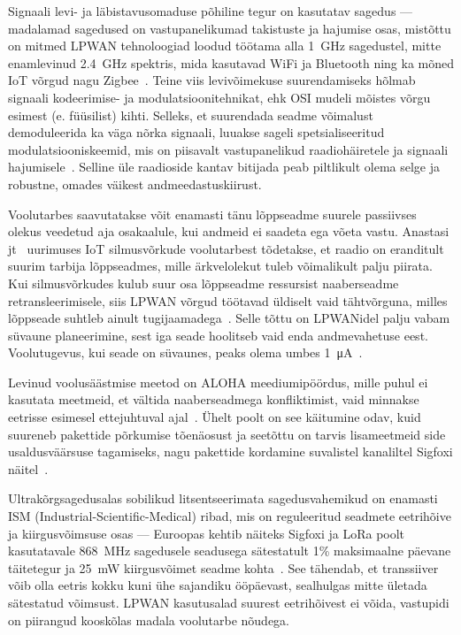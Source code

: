 \documentclass[12pt]{article}
\begin{document}
Signaali levi- ja läbistavusomaduse põhiline tegur on kasutatav sagedus — madalamad sagedused on vastupanelikumad takistuste ja hajumise osas, mistõttu on mitmed LPWAN tehnoloogiad loodud töötama alla \SI{1}{\giga\hertz} sagedustel, mitte enamlevinud \SI{2,4}{\giga\hertz} spektris, mida kasutavad WiFi ja Bluetooth ning ka mõned IoT võrgud nagu Zigbee~\cite{bardyn}.
Teine viis levivõimekuse suurendamiseks hõlmab signaali kodeerimise- ja modulatsioonitehnikat, ehk OSI mudeli mõistes võrgu esimest (e. füüsilist) kihti. Selleks, et suurendada seadme võimalust demoduleerida ka väga nõrka signaali, luuakse sageli spetsialiseeritud modulatsiooniskeemid, mis on piisavalt vastupanelikud raadiohäiretele ja signaali hajumisele~\cite{reynders}.
Selline üle raadioside kantav bitijada peab piltlikult olema selge ja robustne, omades väikest andmeedastuskiirust.

Voolutarbes saavutatakse võit enamasti tänu lõppseadme suurele passiivses olekus veedetud aja osakaalule, kui andmeid ei saadeta ega võeta vastu.
Anastasi jt~\cite{anastasi} uurimuses IoT silmusvõrkude voolutarbest tõdetakse, et raadio on eranditult suurim tarbija lõppseadmes, mille ärkvelolekut tuleb võimalikult palju piirata.
Kui silmusvõrkudes kulub suur osa lõppseadme ressursist naaberseadme retransleerimisele, siis LPWAN võrgud töötavad üldiselt vaid tähtvõrguna,  milles lõppseade suhtleb ainult tugijaamadega~\cite{centenaro}.
Selle tõttu on LPWANidel palju vabam süvaune planeerimine, sest iga seade hoolitseb vaid enda andmevahetuse eest. Voolutugevus, kui seade on süvaunes, peaks olema umbes \SI{1}{\micro\ampere}~\cite{goursaud}.

Levinud voolusäästmise meetod on ALOHA meediumipöördus, mille puhul ei kasutata meetmeid, et vältida naaberseadmega konfliktimist, vaid minnakse eetrisse esimesel ettejuhtuval ajal~\cite{raza}.
Ühelt poolt on see käitumine odav, kuid suureneb pakettide põrkumise tõenäosust ja seetõttu on tarvis lisameetmeid side usaldusväärsuse tagamiseks, nagu pakettide kordamine suvalistel kanaliltel Sigfoxi näitel~\cite{raza}.

Ultrakõrgsagedusalas sobilikud litsentseerimata sagedusvahemikud on enamasti ISM (Industrial-Scientific-Medical) ribad, mis on reguleeritud seadmete eetrihõive ja kiirgusvõimsuse osas — Euroopas kehtib näiteks Sigfoxi ja LoRa poolt kasutatavale \SI{868}{\mega\hertz} sagedusele seadusega sätestatult 1\% maksimaalne päevane täitetegur ja \SI{25}{\milli\watt} kiirgusvõimet seadme kohta~\cite{etsi}.
See tähendab, et transsiiver võib olla eetris kokku kuni ühe sajandiku ööpäevast, sealhulgas mitte ületada sätestatud võimsust.
LPWAN kasutusalad suurest eetrihõivest ei võida, vastupidi on piirangud kooskõlas madala voolutarbe nõudega.
\end{document}
